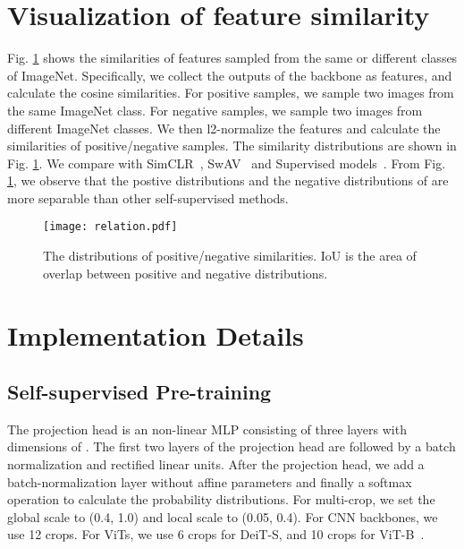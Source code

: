 \documentclass[10pt,twocolumn,letterpaper]{article}
\begin{document}
\section{Visualization of feature similarity}
Fig. \ref{relation} shows the similarities of features sampled from the same or different classes of ImageNet. Specifically, we collect the outputs of the backbone as features, and calculate the cosine similarities. For positive samples, we sample two images from the same ImageNet class. For negative samples, we sample two images from different ImageNet classes. We then l2-normalize the features and calculate the similarities of positive/negative samples. The similarity distributions are shown in Fig. \ref{relation}. We compare \ourmethod with SimCLR~\cite{chen2020simple}, SwAV~\cite{caron2020unsupervised} and Supervised models~\cite{he2016deep}. From Fig. \ref{relation}, we observe that the postive distributions and the negative distributions of \ourmethod are more separable than other self-supervised methods. 

\begin{figure}[t]
   \begin{center}
   \texttt{[image: relation.pdf]}
   \end{center}
  \vspace{-0.4cm}
   \caption{The distributions of positive/negative similarities. IoU is the area of overlap between positive and negative distributions.}
   \label{relation}
\end{figure}



\section{Implementation Details}
\subsection{Self-supervised Pre-training}
The projection head is an non-linear MLP consisting of three layers with dimensions of . The first two layers of the projection head are followed by a batch normalization and rectified linear units. After the projection head, we add a batch-normalization layer without affine parameters and finally a softmax operation to calculate the probability distributions. 
For multi-crop, we set the global scale to (0.4, 1.0) and local scale to (0.05, 0.4). For CNN backbones, we use 12 crops. For  ViTs, we use 6 crops for DeiT-S, and 10 crops for ViT-B~\cite{caron2021emerging}.
\end{document}
